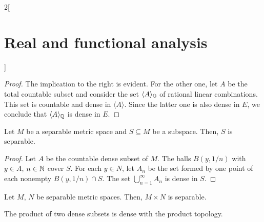 \documentclass[../../../main_math.tex]{subfiles}
\begin{document}
\begin{multicols}{2}[\section{Real and functional analysis}]
\begin{proposition}
  \end{proposition}
  \begin{proof}
    The implication to the right is evident. For the other one, let $A$ be the total countable subset and consider the set $\langle A\rangle_{\mathbb{Q}}$ of rational linear combinations. This set is countable and dense in $\langle A\rangle$. Since the latter one is also dense in $E$, we conclude that $\langle A\rangle_{\mathbb{Q}}$ is dense in $E$.
  \end{proof}
  \begin{proposition}
    Let $M$ be a separable metric space and $S\subseteq M$ be a subspace. Then, $S$ is separable.
  \end{proposition}
  \begin{proof}
    Let $A$ be the countable dense subset of $M$. The balls $B(y,1/n)$ with $y\in A$, $n\in\mathbb{N}$ cover $S$. For each $y\in N$, let $A_n$ be the set formed by one point of each nonempty $B(y,1/n)\cap S$. The set $\bigcup_{n=1}^\infty A_n$ is dense in $S$.
  \end{proof}
  \begin{proposition}
    Let $M$, $N$ be separable metric spaces. Then, $M\times N$ is separable.
  \end{proposition}
  \begin{sproof}
    The product of two dense subsets is dense with the product topology.
  \end{sproof}

\end{multicols}
\end{document}
